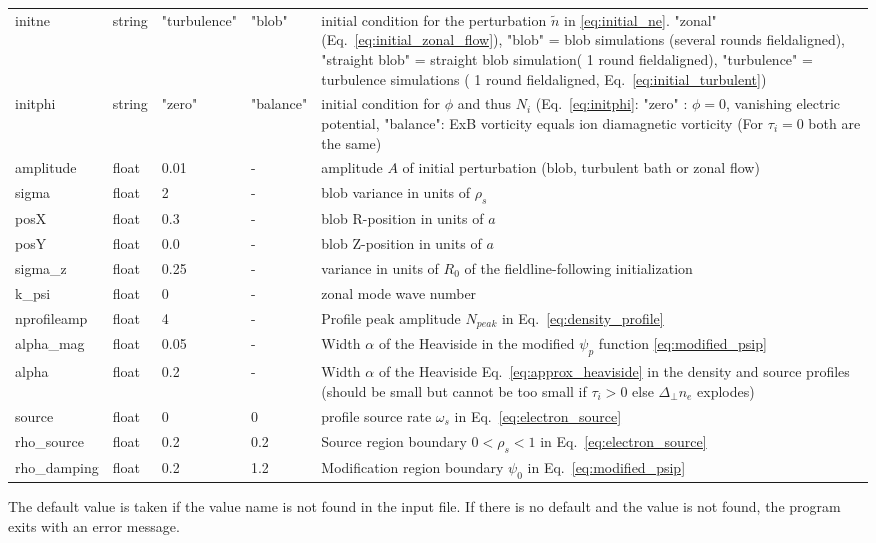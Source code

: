 \begin{longtable}{llll>{\RaggedRight}p{6cm}}
initne    & string & "turbulence"     & "blob"  & initial condition for the
perturbation $\tilde n$ in \eqref{eq:initial_ne}. "zonal" (Eq.~\eqref{eq:initial_zonal_flow}),
    "blob" = blob simulations (several rounds fieldaligned),
    "straight blob" = straight blob simulation( 1 round fieldaligned),
    "turbulence" = turbulence simulations ( 1 round fieldaligned, Eq.~\eqref{eq:initial_turbulent})\\
initphi   & string & "zero"  & "balance" & initial condition for $\phi$ and thus $N_i$ (Eq.~\eqref{eq:initphi}: "zero" : $\phi = 0$, vanishing
electric potential, "balance": ExB vorticity equals ion diamagnetic vorticity (For $\tau_i =0 $ both are the same)
\\
amplitude  & float &0.01   & - & amplitude $A$ of initial perturbation (blob, turbulent bath or zonal flow)  \\
sigma      & float &2      & - & blob variance in units of $\rho_s$ \\
posX       & float &0.3    & - & blob R-position in units of $a$\\
posY       & float &0.0    & - & blob Z-position in units of $a$ \\
sigma\_z    & float &0.25   & - & variance in units of $R_0$ of the fieldline-following initialization \\
k\_psi     & float &0    & - & zonal mode wave number  \\
nprofileamp& float &4   & - & Profile peak amplitude $N_{peak}$ in Eq.~\eqref{eq:density_profile} \\
alpha\_mag   & float & 0.05 & - & Width $\alpha$ of the Heaviside in the modified $\psi_p$ function \eqref{eq:modified_psip}\\
alpha       & float & 0.2 & - & Width $\alpha$ of the Heaviside Eq.~\eqref{eq:approx_heaviside} in the density and source profiles (should be small but cannot be too small if $\tau_i > 0$ else $\Delta_\perp n_e$ explodes) \\
source      & float & 0    & 0 & profile source rate $\omega_s$ in Eq.~\eqref{eq:electron_source} \\
rho\_source & float & 0.2  & 0.2 & Source region boundary $0<\rho_{s}<1$ in Eq.~\eqref{eq:electron_source}  \\
rho\_damping& float & 0.2  & 1.2 & Modification region boundary $\psi_0$ in Eq.~\eqref{eq:modified_psip}  \\
\bottomrule
\end{longtable}
The default value is taken if the value name is not found in the input file. If there is no default and
the value is not found,
the program exits with an error message.
